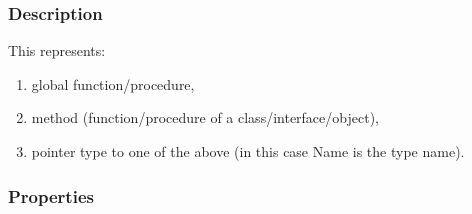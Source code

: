 \documentclass{report}
\begin{document}
\subsubsection*{\large{\textbf{Description}}\normalsize\hspace{1ex}\hfill}
This represents: \begin{enumerate}
\setcounter{enumi}{0} \setcounter{enumii}{0} \setcounter{enumiii}{0} \setcounter{enumiv}{0} 
\item global function/procedure,
\setcounter{enumi}{1} \setcounter{enumii}{1} \setcounter{enumiii}{1} \setcounter{enumiv}{1} 
\item method (function/procedure of a class/interface/object),
\setcounter{enumi}{2} \setcounter{enumii}{2} \setcounter{enumiii}{2} \setcounter{enumiv}{2} 
\item pointer type to one of the above (in this case Name is the type name).
\end{enumerate}\subsubsection*{\large{\textbf{Properties}}\normalsize\hspace{1ex}\hfill}
\end{document}
